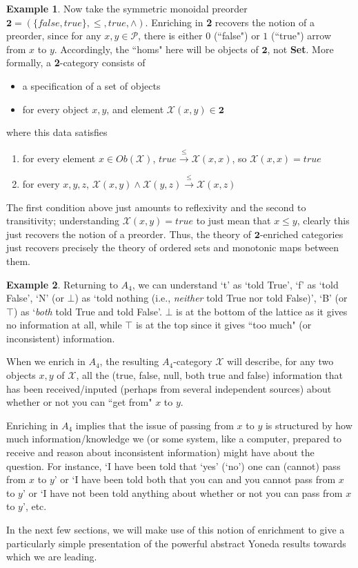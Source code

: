 \documentclass[a4paper]{book}
\theoremstyle{definition}
\newtheorem{example}{Example}[section]
\theoremstyle{definition}
\theoremstyle{definition}
\theoremstyle{theorem}
\theoremstyle{definition}
\begin{document}
\begin{example}
	Now take the symmetric monoidal preorder $\textbf{2} = (\{false, true\}, \leq, true, \wedge)$. Enriching in \textbf{2} recovers the notion of a preorder, since for any $x,y \in \mathcal{P}$, there is either $0$ (``false") or $1$ (``true") arrow from $x$ to $y$. Accordingly, the ``homs" here will be objects of $\textbf{2}$, not \textbf{Set}. More formally, a \textbf{2}-category consists of 
	\begin{itemize}
		\item a specification of a set of objects
		\item for every object $x, y$, and element $\mathcal{X}(x,y) \in \textbf{2}$
	\end{itemize} 
	where this data satisfies 
	\begin{enumerate} 
		\item for every element $x \in Ob(\mathcal{X})$, $true \xrightarrow{\leq} \mathcal{X}(x,x)$, so $\mathcal{X}(x,x) = true$
		\item for every $x,y,z$, $\mathcal{X}(x,y) \wedge \mathcal{X}(y,z) \xrightarrow{\leq} \mathcal{X}(x,z)$ 
	\end{enumerate}
	The first condition above just amounts to reflexivity and the second to transitivity; understanding $\mathcal{X}(x,y) = true$ to just mean that $x \leq y$, clearly this just recovers the notion of a preorder. Thus, the theory of $\textbf{2}$-enriched categories just recovers precisely the theory of ordered sets and monotonic maps between them.
\end{example}
\begin{example}
	Returning to $A_4$, we can understand `t' as `told True', `f' as `told False', `N' (or $\bot$) as `told nothing (i.e., \textit{neither} told True nor told False)', `B' (or $\top$) as `\textit{both} told True and told False'. $\bot$ is at the bottom of the lattice as it gives no information at all, while $\top$ is at the top since it gives ``too much" (or inconsistent) information. \par 
	When we enrich in $A_4$, the resulting $A_4$-category $\mathcal{X}$ will describe, for any two objects $x,y$ of $\mathcal{X}$, all the (true, false, null, both true and false) information that has been received/inputed (perhaps from several independent sources) about whether or not you can ``get from" $x$ to $y$. \par 
	Enriching in $A_4$ implies that the issue of passing from $x$ to $y$ is structured by how much information/knowledge we (or some system, like a computer, prepared to receive and reason about inconsistent information) might have about the question. For instance, `I have been told that `yes' (`no') one can (cannot) pass from $x$ to $y$' or `I have been told both that you can and you cannot pass from $x$ to $y$' or `I have not been told anything about whether or not you can pass from $x$ to $y$', etc. 
\end{example}
In the next few sections, we will make use of this notion of enrichment to give a particularly simple presentation of the powerful abstract Yoneda results towards which we are leading.
\end{document}
